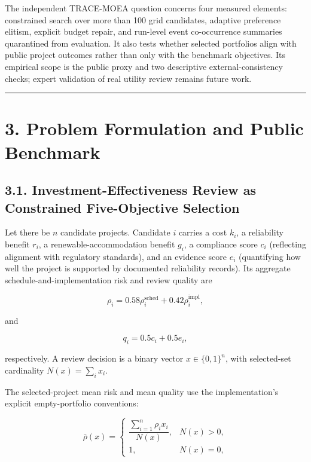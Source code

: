 \documentclass[
  10pt,
  a4paper,
]{article}
\begin{document}
The independent TRACE-MOEA question concerns four measured elements:
constrained search over more than 100 grid candidates, adaptive
preference elitism, explicit budget repair, and run-level event
co-occurrence summaries quarantined from evaluation. It also tests
whether selected portfolios align with public project outcomes rather
than only with the benchmark objectives. Its empirical scope is the
public proxy and two descriptive external-consistency checks; expert
validation of real utility review remains future work.

\begin{center}\rule{0.5\linewidth}{0.5pt}\end{center}

\section{3. Problem Formulation and Public
Benchmark}\label{problem-formulation-and-public-benchmark}

\subsection{3.1. Investment-Effectiveness Review as Constrained
Five-Objective
Selection}\label{investment-effectiveness-review-as-constrained-five-objective-selection}

Let there be \(n\) candidate projects. Candidate \(i\) carries a cost
\(k_i\), a reliability benefit \(r_i\), a renewable-accommodation
benefit \(g_i\), a compliance score \(c_i\) (reflecting alignment with
regulatory standards), and an evidence score \(e_i\) (quantifying how
well the project is supported by documented reliability records). Its
aggregate schedule-and-implementation risk and review quality are

\[
\rho_i=0.58\rho_i^{\mathrm{sched}}+0.42\rho_i^{\mathrm{impl}},
\]

and

\[
q_i=0.5c_i+0.5e_i,
\]

respectively. A review decision is a binary vector \(x\in\{0,1\}^{n}\),
with selected-set cardinality \(N(x)=\sum_i x_i\).

The selected-project mean risk and mean quality use the implementation's
explicit empty-portfolio conventions:

\[
\bar\rho(x)=
\begin{cases}
\dfrac{\sum_{i=1}^{n}\rho_i x_i}{N(x)},&N(x)>0,\\
1,&N(x)=0,
\end{cases}
\]
\end{document}
